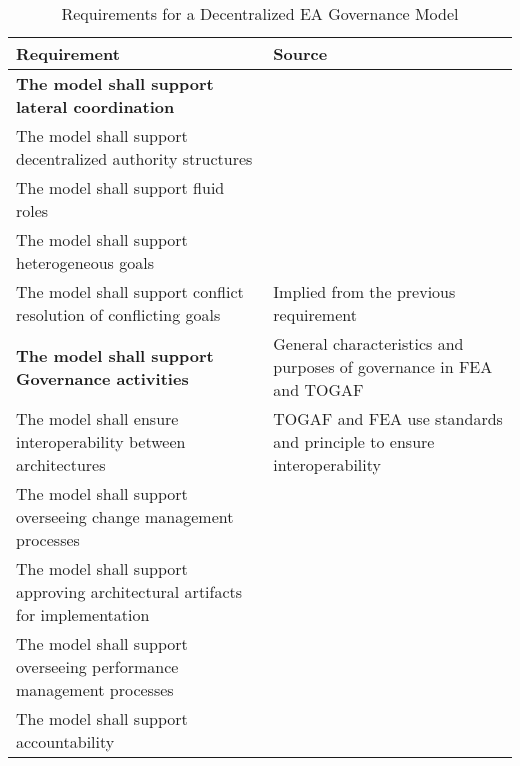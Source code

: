 \begin{table}
\caption{Requirements for a Decentralized EA Governance Model}
\label{table:requirements}
\begin{tabular}{ | p{} | p{} |}
%
\hline
%
\textbf{Requirement} & 
\textbf{Source}  \\
%
\hline
%
\textbf{The model shall support lateral coordination} & \\
%
%
The model shall support decentralized authority structures & 
\cite{Weill2004,pearlson2009,robbins1997,Camarinha-Matos2005} \\
%
The model shall support fluid roles &
\cite{valveHandbook} \\
%
%
The model shall support heterogeneous goals & 
\cite{Camarinha-Matos2005} \\
%
%
The model shall support conflict resolution of conflicting goals  & 
Implied from the previous requirement \\
%
\hline
%
\textbf{The model shall support Governance activities}  & 
General characteristics and purposes of governance in FEA \cite[Sec. 2]{FEA_PMO2007} and TOGAF \cite[Ch. 50]{togaf9.1} \\
%
%
The model shall ensure interoperability between architectures  & 
TOGAF and FEA use standards and principle to ensure interoperability \\
%
%
The model shall support overseeing change management processes & 
 \\
%
%
The model shall support approving architectural artifacts for implementation  & 
 \\
%
%
The model shall support overseeing performance management processes & 
 \\
%
%
The model shall support accountability & 
 \\
%
\hline
%
\end{tabular}
\end{table}

%
%

